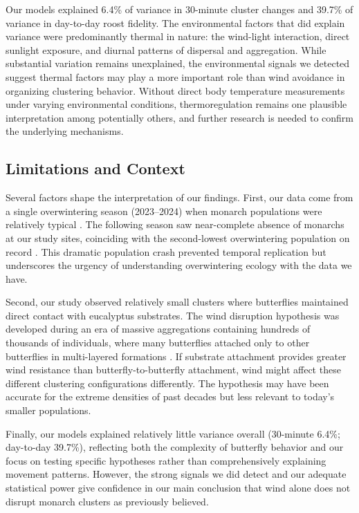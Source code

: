 Our models explained 6.4\% of variance in 30-minute cluster changes and 39.7\% of variance in day-to-day roost fidelity. The environmental factors that did explain variance were predominantly thermal in nature: the wind-light interaction, direct sunlight exposure, and diurnal patterns of dispersal and aggregation. While substantial variation remains unexplained, the environmental signals we detected suggest thermal factors may play a more important role than wind avoidance in organizing clustering behavior. Without direct body temperature measurements under varying environmental conditions, thermoregulation remains one plausible interpretation among potentially others, and further research is needed to confirm the underlying mechanisms.

\subsection{Limitations and Context}

Several factors shape the interpretation of our findings. First, our data come from a single overwintering season (2023--2024) when monarch populations were relatively typical \parencite{xercessocietyWesternMonarchThanksgiving2025}. The following season saw near-complete absence of monarchs at our study sites, coinciding with the second-lowest overwintering population on record \parencite{xercessocietyWesternMonarchButterfly2025}. This dramatic population crash prevented temporal replication but underscores the urgency of understanding overwintering ecology with the data we have.

Second, our study observed relatively small clusters where butterflies maintained direct contact with eucalyptus substrates. The wind disruption hypothesis was developed during an era of massive aggregations containing hundreds of thousands of individuals, where many butterflies attached only to other butterflies in multi-layered formations \parencite{leongMicroenvironmentalFactorsAssociated1990,browerMonarchButterflyClusters2008}. If substrate attachment provides greater wind resistance than butterfly-to-butterfly attachment, wind might affect these different clustering configurations differently. The hypothesis may have been accurate for the extreme densities of past decades but less relevant to today's smaller populations.

Finally, our models explained relatively little variance overall (30-minute 6.4\%; day-to-day 39.7\%), reflecting both the complexity of butterfly behavior and our focus on testing specific hypotheses rather than comprehensively explaining movement patterns. However, the strong signals we did detect and our adequate statistical power give confidence in our main conclusion that wind alone does not disrupt monarch clusters as previously believed.

